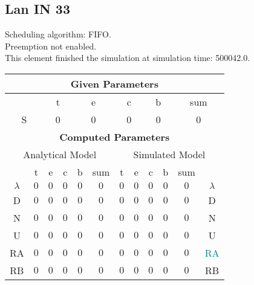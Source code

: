 \documentclass{article}
\begin{document}
\subsection{Lan IN 33}
Scheduling algorithm: FIFO.\\Preemption not enabled. \\This element finished the simulation at simulation time: 500042.0.\\
\begin{table}[H]\centering\begin{tabular}{@{}c|cccc|c||cccc|c|c@{}}\toprule\multicolumn{12}{c}{\textbf{Given Parameters}}\\\midrule\multicolumn{2}{c|}{ } & \multicolumn{2}{c}{t} & \multicolumn{2}{c}{e} & \multicolumn{2}{c}{c} & \multicolumn{2}{c}{b} & \multicolumn{2}{|c}{sum} \\ \midrule\multicolumn{2}{c|}{S} & \multicolumn{2}{c}{0} & \multicolumn{2}{c}{0} & \multicolumn{2}{c}{0} & \multicolumn{2}{c}{0} & \multicolumn{2}{|c}{0}\\ \midrule\midrule\multicolumn{12}{c}{\textbf{Computed Parameters}}\\ \midrule\multicolumn{6}{c||}{Analytical Model} & \multicolumn{6}{c}{Simulated Model}\\ 
 \midrule & t & e & c & b & sum & t & e & c & b & sum &  \\ \midrule$\lambda$ &$0$ & $0$ & $0$ & $0$ & $0$ & $0$ & $0$ & $0$ & $0$ & $0$& $\lambda$ \\D & $0$ & $0$ & $0$ & $0$ & $0$ & $0$ & $0$ & $0$ & $0$ & $0$& D\\N & $0$ & $0$ & $0$ & $0$ & $0$ & $0$ & $0$ & $0$ & $0$ & $0$& N\\U & $0$ & $0$ & $0$ & $0$ & $0$ & $0$ & $0$ & $0$ & $0$ & $0$& U\\RA & $0$ & $0$ & $0$ & $0$ & $0$ & $0$ & $0$ & $0$ & $0$ & $0$& \textcolor{teal}{RA}\\RB & $0$ & $0$ & $0$ & $0$ & $0$ & $0$ & $0$ & $0$ & $0$ & $0$& RB\\
\bottomrule
\end{tabular}
\end{table}
\filbreak
\end{document}
